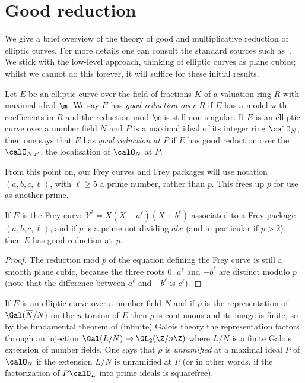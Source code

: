 \section{Good reduction}

We give a brief overview of the theory of good and multiplicative reduction of elliptic curves.
For more details one can consult the standard sources such as~\cite{silverman1}. We stick with the low-level approach, thinking of elliptic curves as plane cubics; whilst we cannot do this forever, it will suffice for these initial results.

\begin{definition}\label{EllipticCurve.GoodReduction} Let $E$ be an elliptic curve over the field of fractions $K$ of a valuation ring $R$ with maximal ideal $\m$. We say $E$ has \emph{good reduction over $R$} if $E$ has a model with
coefficients in $R$ and the reduction mod $\m$ is still non-singular. If $E$ is an elliptic curve
over a number field $N$ and $P$ is a maximal ideal of its integer ring $\calO_N$, then one says that $E$ has \emph{good reduction at $P$} if $E$ has good reduction over the $\calO_{N,P}$, the localisation of $\calO_N$ at $P$.
\end{definition}

\begin{remark} From this point on, our Frey curves and Frey packages will use notation $(a,b,c,\ell)$, with $\ell\geq 5$ a prime number, rather than $p$. This frees up $p$ for use as another prime.
\end{remark}

\begin{lemma}\label{Frey_curve_good_reduction} If $E$ is the Frey curve $Y^2=X(X-a^\ell)(X+b^\ell)$ associated to a
  Frey package $(a,b,c,\ell)$, and if $p$ is a prime
  not dividing $abc$ (and in particular if $p>2$), then $E$ has good reduction at~$p$.
\end{lemma}
\begin{proof} The reduction mod $p$ of the equation defining the Frey curve is still a smooth
  plane cubic, because the three roots $0$, $a^\ell$ and $-b^\ell$ are distinct modulo $p$
  (note that the difference between $a^\ell$ and $-b^\ell$ is $c^\ell$).
\end{proof}

If $E$ is an elliptic curve over a number field $N$ and if $\rho$ is the representation
of $\Gal(\overline{N}/N)$ on the $n$-torsion of $E$ then $\rho$ is continuous and its image is finite,
so by the fundamental theorem of (infinite) Galois theory the representation factors through an
injection $\Gal(L/N)\to\GL_2(\Z/n\Z)$ where $L/N$ is a finite Galois extension of
number fields. One says that $\rho$ is \emph{unramified} at a maximal ideal $P$ of $\calO_N$
if the extension $L/N$ is unramified at $P$ (or in other words, if the factorization
of $P\calO_L$ into prime ideals is squarefree).

